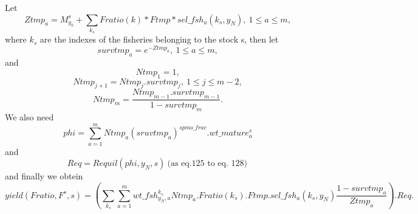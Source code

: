 \documentclass{article}
\begin{document}
Let
\begin{equation}
    Ztmp_a=M^s_{y_0}+\sum_{k_s}Fratio(k)*Ftmp*sel\_fsh_a(k_s,y_N), \ 1\leq a \leq m, 
\end{equation}
where $k_s$ are the indexes of the fisheries belonging to the stock s, then let
\begin{equation}
    survtmp_a=e^{-Ztmp_a}, \ 1\leq a \leq m,
\end{equation}
and
\begin{equation}
    Ntmp_1=1,
\end{equation}
\begin{equation}
    Ntmp_{j+1}=Ntmp_j.survtmp_j, \ 1\leq j \leq m-2,
\end{equation}
\begin{equation}
    Ntmp_m=\dfrac{Ntmp_{m-1}.survtmp_{m-1}}{1-survtmp_m}.
\end{equation}
We also need
\begin{equation}
    phi=\sum_{a=1}^m Ntmp_a(sruvtmp_a)^{spmo\_frac}.wt\_mature^s_a
\end{equation}
and
\begin{equation}
    Req=Requil(phi,y_N,s) \  \text{(as eq.125 to eq. 128)}\,
\end{equation}
and finally we obtein
\begin{equation}
    yield(Fratio, F^s,s)=\left(\sum_{k_s}\sum_{a=1}^m wt\_fsh^{k_s}_{y_N,a}Ntmp_a.Fratio(k_s).Ftmp.sel\_fsh_a(k_s,y_N)\dfrac{1-survtmp_a}{Ztmp_a}\right).Req.
\end{equation}
\end{document}
